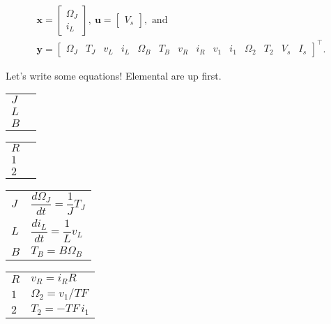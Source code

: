 \documentclass[dynamic_systems.tex]{subfiles}
\begin{document}
\setcounter{MaxMatrixCols}{20}
\begin{gather*}
	\bm{x} = 
	\begin{bmatrix} \Omega_J \\ i_L \end{bmatrix}, \
	\bm{u} = 
	\begin{bmatrix} V_s \end{bmatrix},\text{ and} \\
	\bm{y} = 
	\begin{bmatrix} 
	\Omega_J & 
	T_J & 
	v_L & 
	i_L & 
	\Omega_B & 
	T_B & 
	v_R & 
	i_R & 
	v_1 & 
	i_1 & 
	\Omega_2 & 
	T_2 & 
	V_s & 
	I_s 
	\end{bmatrix}^\top.
\end{gather*}

Let's write some equations!
Elemental are up first.
\begin{center}
\begingroup
\renewcommand{\arraystretch}{2}
\ifdefined\ispartial
\begin{tabular}{l|l}
	$J$ & \phantom{$\dfrac{d \Omega_J}{d t} = \dfrac{1}{J} T_J$}\\
	$L$ & \phantom{$\dfrac{d i_L}{d t} = \dfrac{1}{L} v_L$}\\
	$B$ & \phantom{$T_B = B \Omega_B$}
\end{tabular}
\qquad\qquad
\begin{tabular}{l|l}
	$R$ & \phantom{$v_R = i_R R$}\\
	$1$ & \phantom{$\Omega_2 = v_1/TF$}\\
	$2$ & \phantom{$T_2 = -TF\, i_1$}
\end{tabular}
\else
\begin{tabular}{l|l}
	$J$ & $\dfrac{d \Omega_J}{d t} = \dfrac{1}{J} T_J$\\
	$L$ & $\dfrac{d i_L}{d t} = \dfrac{1}{L} v_L$\\
	$B$ & $T_B = B \Omega_B$
\end{tabular}
\qquad\qquad
\begin{tabular}{l|l}
	$R$ & $v_R = i_R R$\\
	$1$ & $\Omega_2 = v_1/TF$\\
	$2$ & $T_2 = -TF\, i_1$
\end{tabular}
\fi
\endgroup
\end{center}
\end{document}
